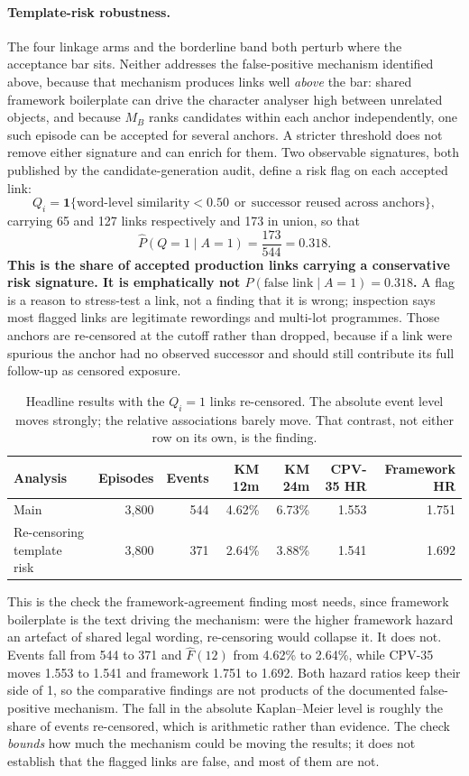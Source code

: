 \documentclass[11pt,a4paper]{article}
\begin{document}
\paragraph{Template-risk robustness.} The four linkage arms and the borderline
band both perturb where the acceptance bar sits. Neither addresses the
false-positive mechanism identified above, because that mechanism produces links
well \emph{above} the bar: shared framework boilerplate can drive the character
analyser high between unrelated objects, and because \(M_B\) ranks candidates
within each anchor independently, one such episode can be accepted for several
anchors. A stricter threshold does not remove either signature and can enrich for
them. Two observable signatures, both published by the candidate-generation
audit, define a risk flag on each accepted link:
\[
Q_i=\mathbf{1}\{\text{word-level similarity}<0.50
\ \ \text{or}\ \ \text{successor reused across anchors}\} ,
\]
carrying 65 and
127 links respectively and
173 in union, so that
\[
\hat{P}(Q=1\mid A=1)=\frac{173}{544}
=0.318 .
\]
\textbf{This is the share of accepted production links carrying a conservative
risk signature. It is emphatically not
\(P(\text{false link}\mid A=1)=0.318\).}
A flag is a reason to stress-test a link, not a finding that it is wrong;
inspection says most flagged links are legitimate rewordings and multi-lot
programmes. Those anchors are re-censored at the cutoff rather than dropped,
because if a link were spurious the anchor had no observed successor and should
still contribute its full follow-up as censored exposure.
\begin{table}[H]
\centering
\small
\begin{tabularx}{\textwidth}{Xrrrrrr}
\toprule
Analysis & Episodes & Events & KM 12m & KM 24m & CPV-35 HR & Framework HR \\
\midrule
Main & 3,800 & 544 & 4.62\% & 6.73\% & 1.553 & 1.751 \\
Re-censoring template risk & 3,800 & 371 & 2.64\% & 3.88\% & 1.541 & 1.692 \\
\bottomrule
\end{tabularx}
\caption{Headline results with the \(Q_i=1\) links re-censored. The absolute
event level moves strongly; the relative associations barely move. That
contrast, not either row on its own, is the finding.}
\end{table}
This is the check the framework-agreement finding most needs, since framework
boilerplate is the text driving the mechanism: were the higher framework hazard
an artefact of shared legal wording, re-censoring would collapse it. It does
not. Events fall from 544 to 371 and
\(\hat{F}(12)\) from 4.62\% to
2.64\%, while CPV-35 moves
1.553 to 1.541 and
framework 1.751 to
1.692. Both hazard ratios keep their side of 1,
so the comparative findings are not products of the documented false-positive
mechanism. The fall in the absolute Kaplan--Meier level is roughly the share of
events re-censored, which is arithmetic rather than evidence. The check
\emph{bounds} how much the mechanism could be moving the results; it does not
establish that the flagged links are false, and most of them are not.
\end{document}
